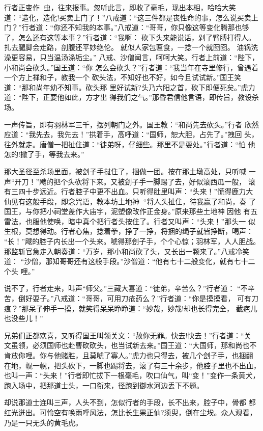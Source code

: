行者正变作虫，往来报事。忽听此言，即收了毫毛，现出本相，哈哈大笑
道：“造化，造化!买卖上门了！”八戒道：“这三件都是丧性命的事，怎么说买卖上
门？”行者道：“你还不知我的本事。”八戒道：“哥哥，你只像这等变化腾那也够
了，怎么还有这等本事？”行者道：“我啊：
砍下头来能说话，剁了臂膊打得人。
扎去腿脚会走路，剖腹还平妙绝伦。
就似人家包匾食，一捻一个就囫囵。
油锅洗澡更容易，只当温汤涤垢尘。”
八戒、沙僧闻言，呵呵大笑。行者上前道：“陛下，小和尚会砍头。”国王道：“你
怎么会砍头？”行者道：“我当年在寺里修行，曾遇着一个方上禅和子，教我一个
砍头法，不知好也不好，如今且试试新。”国王笑道：“那和尚年幼不知事。砍头那
里好试新?头乃六阳之首，砍下即便死矣。”虎力道：“陛下，正要他如此，方才出
得我们之气。”那昏君信他言语，即传旨，教设杀场。

一声传旨，即有羽林军三千，摆列朝门之外。国王教：“和尚先去砍头。”行者
欣然应道：“我先去，我先去！”拱着手，高呼道：“国师，恕大胆，占先了。”拽回
头，往外就走。唐僧一把扯住道：“徒弟呀，仔细些。那里不是耍处。”行者道：“怕
他怎的!撒了手，等我去来。”

那大圣径至杀场里面，被刽子手挝住了，捆做一团。按在那土墩高处，只听喊
一声“开刀！”飕的把个头砍将下来。又被刽子手一脚踢了去，好似滚西瓜一般，
滚有三四十步远近。行者腔子中更不出血。只听得肚里叫声：“头来！”慌得鹿力大
仙见有这般手段，即念咒语，教本坊土地神：“将人头扯住，待我赢了和尚，奏
了国王，与你把小祠堂盖作大庙宇，泥塑像改作正金身。”原来那些土地神因他
有五雷法，也服他使唤，暗中真个把行者头按住了。行者又叫声：“头来！”那头一
似生根，莫想得动。行者心焦，捻着拳，挣了一挣，将捆的绳子就皆挣断，喝声：
“长！”飕的腔子内长出一个头来。唬得那刽子手，个个心惊；羽林军，人人胆战。
那监斩官急走入朝奏道：“万岁，那小和尚砍了头，又长出一颗来了。”八戒冷笑道：
“沙僧，那知哥哥还有这般手段。”沙僧道：“他有七十二般变化，就有七十二个头
哩。”

说不了，行者走来，叫声“师父。”三藏大喜道：“徒弟，辛苦么？”行者道：
“不辛苦，倒好耍子。”八戒道：“哥哥，可用刀疮药么？”行者道：“你是摸摸看，
可有刀痕？”那呆子伸手一摸，就笑得呆呆睁睁道：“妙哉，妙哉!却也长得完全，
截疤儿也没些儿！”

兄弟们正都欢喜，又听得国王叫领关文：“赦你无罪。快去!快去！”行者道：“关
文虽领，必须国师也赴曹砍砍头，也当试新去来。”国王道：“大国师，那和尚也不
肯放你哩。你与他赌胜，且莫唬了寡人。”虎力也只得去，被几个刽子手，也捆翻
在地，幌一幌，把头砍下，一脚也踢将去，滚了有三十余步，他腔子里也不出血，
也叫一声：“头来！”行者即忙拔下一根毫毛，吹口仙气，叫“变！”变作一条黄犬，
跑入场中，把那道士头，一口衔来，径跑到御水河边丢下不题。

却说那道士连叫三声，人头不到，怎似行者的手段，长不出来，腔子中，骨都
都红光迸出。可怜空有唤雨呼风法，怎比长生果正仙?须臾，倒在尘埃。众人观看，
乃是一只无头的黄毛虎。


